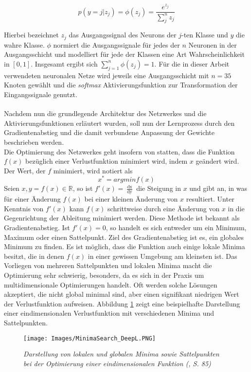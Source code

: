 \documentclass[a4paper,11pt]{article}
\begin{document}
\[p(y = j |z_j) = \phi(z_j) = \frac{e^{z_j}}{\sum_j^n z_j} \]

Hierbei bezeichnet $z_j$ das Ausgangssignal des Neurons der $j$-ten Klasse und $y$ die wahre Klasse. $\phi$ normiert die Ausgangssignale für jedes der $n$ Neuronen in der Ausgangsschicht und modelliert für jede der Klassen eine Art Wahrscheinlichkeit in $\left[0, 1\right]$. Insgesamt ergibt sich $\sum_{j = 1}^n \phi(z_j) = 1$. Für die in dieser Arbeit verwendeten neuronalen Netze wird jeweils eine Ausgangsschicht mit $n = 35$ Knoten gewählt und die \textit{softmax} Aktivierungsfunktion zur Transformation der Eingangssignale genutzt.\\
\\
Nachdem nun die grundlegende Architektur des Netzwerkes und die Aktivierungsfunktionen erläutert wurden, soll nun der Lernprozess durch den Gradientenabstieg und die damit verbundene Anpassung der Gewichte beschrieben werden.\\

Die Optimierung des Netzwerkes geht insofern von statten, dass die Funktion $f(x)$ bezüglich einer Verlustfunktion minimiert wird, indem $x$ geändert wird. Der Wert, der $f$ minimiert, wird notiert als 
\[x^\ast = argmin f(x)\]
Seien $x, y = f(x) \in \mathbb{R}$, so ist $f'(x) = \frac{\mathop{dx}}{\mathop{dy}}$ die Steigung in $x$ und gibt an, in was für einer Änderung $f(x)$ bei einer kleinen Änderung von $x$ resultiert. Unter Kenntnis von $f'(x)$ kann $f(x)$ schrittweise durch eine Änderung von $x$ in die Gegenrichtung der Ableitung minimiert werden. Diese Methode ist bekannt als Gradientenabstieg. Ist $f'(x) = 0$, so handelt es sich entweder um ein Minimum, Maximum oder einen Sattelpunkt. Ziel des Gradientenabstieg ist es, ein globales Minimum zu finden. Es ist möglich, dass die Funktion auch einige lokale Minima besitzt, die in denen $f(x)$ in einer gewissen Umgebung am kleinsten ist. Das Vorliegen von mehreren Sattelpunkten und lokalen Minima macht die Optimierung sehr schwierig, besonders, da es sich in der Praxis um multidimensionale Optimierungen handelt. Oft werden solche Lösungen akzeptiert, die nicht global minimal sind, aber einen signifikant niedrigen Wert der Verlustfunktion aufweisen. Abbildung \ref{abb:MinimaSearch} zeigt eine beispielhafte Darstellung einer eindimensionalen Verlustfunktion mit verschiedenen Minima und Sattelpunkten.

\begin{figure}[!ht]
\begin{center}
\texttt{[image: Images/MinimaSearch\_DeepL.PNG]}
\label{abb:MinimaSearch}
\caption{\textit{Darstellung von lokalen und globalen Minima sowie Sattelpunkten bei der Optimierung einer eindimensionalen Funktion (\cite{deepL}, S. 85)}}
\end{center}
\end{figure}
\end{document}
